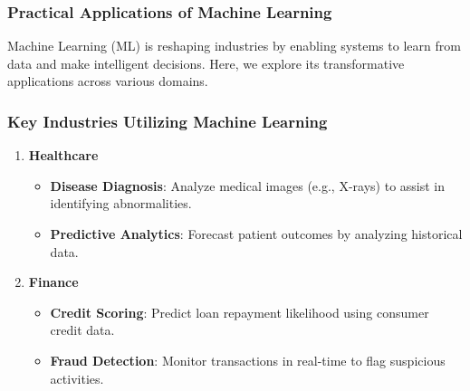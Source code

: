 \documentclass[aspectratio=169]{beamer}
\begin{document}
\begin{frame}[fragile]
    \frametitle{Practical Applications of Machine Learning}
    Machine Learning (ML) is reshaping industries by enabling systems to learn from data and make intelligent decisions. Here, we explore its transformative applications across various domains.
\end{frame}

\begin{frame}[fragile]
    \frametitle{Key Industries Utilizing Machine Learning}
    \begin{enumerate}
        \item \textbf{Healthcare}
            \begin{itemize}
                \item \textbf{Disease Diagnosis}: Analyze medical images (e.g., X-rays) to assist in identifying abnormalities.
                \item \textbf{Predictive Analytics}: Forecast patient outcomes by analyzing historical data.
            \end{itemize}
        \item \textbf{Finance}
            \begin{itemize}
                \item \textbf{Credit Scoring}: Predict loan repayment likelihood using consumer credit data.
                \item \textbf{Fraud Detection}: Monitor transactions in real-time to flag suspicious activities.
            \end{itemize}
    \end{enumerate}
\end{frame}
\end{document}
